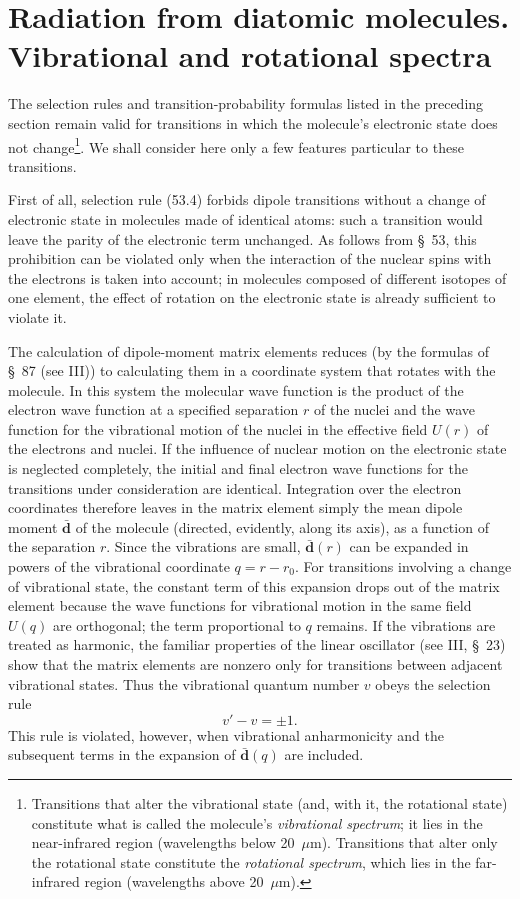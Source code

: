 \section{Radiation from diatomic molecules. Vibrational and rotational spectra}

The selection rules and transition-probability formulas listed in the preceding section remain valid for transitions in which the molecule's electronic state does not change\footnote{Transitions that alter the vibrational state (and, with it, the rotational state) constitute what is called the molecule's \emph{vibrational spectrum}; it lies in the near-infrared region (wavelengths below 20~$\mu$m). Transitions that alter only the rotational state constitute the \emph{rotational spectrum}, which lies in the far-infrared region (wavelengths above 20~$\mu$m).}. We shall consider here only a few features particular to these transitions.

First of all, selection rule (53.4) forbids dipole transitions without a change of electronic state in molecules made of identical atoms: such a transition would leave the parity of the electronic term unchanged. As follows from \S~53, this prohibition can be violated only when the interaction of the nuclear spins with the electrons is taken into account; in molecules composed of different isotopes of one element, the effect of rotation on the electronic state is already sufficient to violate it.

The calculation of dipole-moment matrix elements reduces (by the formulas of \S~87 (see III)) to calculating them in a coordinate system that rotates with the molecule. In this system the molecular wave function is the product of the electron wave function at a specified separation $r$ of the nuclei and the wave function for the vibrational motion of the nuclei in the effective field $U(r)$ of the electrons and nuclei. If the influence of nuclear motion on the electronic state is neglected completely, the initial and final electron wave functions for the transitions under consideration are identical. Integration over the electron coordinates therefore leaves in the matrix element simply the mean dipole moment $\bar{\mathbf d}$ of the molecule (directed, evidently, along its axis), as a function of the separation $r$. Since the vibrations are small, $\bar{\mathbf d}(r)$ can be expanded in powers of the vibrational coordinate $q=r-r_0$. For transitions involving a change of vibrational state, the constant term of this expansion drops out of the matrix element because the wave functions for vibrational motion in the same field $U(q)$ are orthogonal; the term proportional to $q$ remains. If the vibrations are treated as harmonic, the familiar properties of the
linear oscillator (see III, \S~23) show that the matrix elements are nonzero only for transitions between adjacent vibrational states. Thus the vibrational quantum number $v$ obeys the selection rule
\begin{equation}
v'-v=\pm1.
\tag{54.1}
\end{equation}
This rule is violated, however, when vibrational anharmonicity and the subsequent terms in the expansion of $\bar{\mathbf d}(q)$ are included.

